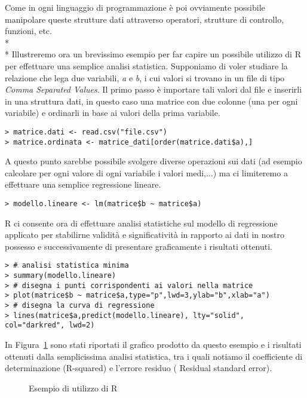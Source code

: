\documentclass[12pt,a4paper,openright,twoside]{report}
\begin{document}
Come in ogni linguaggio di programmazione è poi ovviamente possibile manipolare queste strutture dati attraverso operatori, strutture di controllo, funzioni, etc.\\* \\*
Illustreremo ora un brevissimo esempio per far capire un possibile utilizzo di R per effettuare una semplice analisi statistica. Supponiamo di voler studiare la relazione che lega due variabili, \emph{a} e \emph{b}, i cui valori si trovano in un file di tipo \emph{Comma Separated Values}. Il primo passo è importare tali valori dal file e inserirli in una struttura dati, in questo caso una matrice con due colonne (una per ogni variabile) e ordinarli in base ai valori della prima variabile.

\lstset{language=R}
\begin{lstlisting}
> matrice.dati <- read.csv("file.csv")
> matrice.ordinata <- matrice_dati[order(matrice.dati$a),]
\end{lstlisting}

A questo punto sarebbe possibile svolgere diverse operazioni sui dati (ad esempio calcolare per ogni valore di ogni variabile i valori medi,...) ma ci limiteremo a effettuare una semplice regressione lineare.
\begin{lstlisting}
> modello.lineare <- lm(matrice$b ~ matrice$a)
\end{lstlisting}

R ci consente ora di effettuare analisi statistiche sul modello di regressione applicato per stabilirne validità e significatività in rapporto ai dati in nostro possesso e successivamente di presentare graficamente i risultati ottenuti.
\begin{lstlisting}
> # analisi statistica minima
> summary(modello.lineare)       
> # disegna i punti corrispondenti ai valori nella matrice
> plot(matrice$b ~ matrice$a,type="p",lwd=3,ylab="b",xlab="a")    
> # disegna la curva di regressione
> lines(matrice$a,predict(modello.lineare), lty="solid", col="darkred", lwd=2)    
\end{lstlisting}


In Figura~\ref{example_r} sono stati riportati il grafico prodotto da questo esempio e i risultati ottenuti dalla semplicissima analisi statistica, tra i quali notiamo il coefficiente di determinazione (R-squared) e l'errore residuo (
Residual standard error).

\begin{figure}[H]
	\centering
	\quad
	\caption{Esempio di utilizzo di R}
	\label{example_r}
\end{figure}
\end{document}
